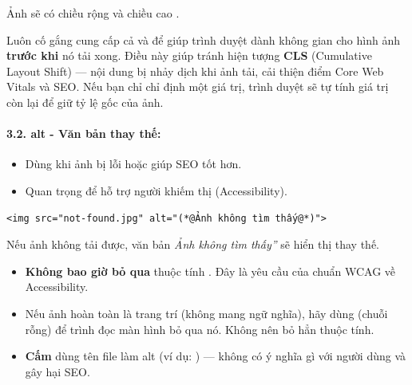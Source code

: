 Ảnh sẽ có chiều rộng \codeinline{200px} và chiều cao \codeinline{150px}.

\begin{tipBox}
Luôn cố gắng cung cấp cả  và  để giúp trình duyệt dành không gian cho hình ảnh \textbf{trước khi} nó tải xong. Điều này giúp tránh hiện tượng \textbf{CLS} (Cumulative Layout Shift) — nội dung bị nhảy dịch khi ảnh tải, cải thiện điểm Core Web Vitals và SEO. Nếu bạn chỉ chỉ định một giá trị, trình duyệt sẽ tự tính giá trị còn lại để giữ tỷ lệ gốc của ảnh.
\end{tipBox}

\paragraph{3.2. alt - Văn bản thay thế:}
\begin{itemize}[leftmargin=1.5em, itemsep=2pt, parsep=0pt]
    \item Dùng khi ảnh bị lỗi hoặc giúp SEO tốt hơn.
    \item Quan trọng để hỗ trợ người khiếm thị (Accessibility).
\end{itemize}

\begin{codeWindow}
\begin{lstlisting}[language=HTML5]
<img src="not-found.jpg" alt="(*@Ảnh không tìm thấy@*)">
\end{lstlisting}
\end{codeWindow}

Nếu ảnh không tải được, văn bản \textit{\codeinline{}Ảnh không tìm thấy''} sẽ hiển thị thay thế.

\begin{warnBox}
\begin{itemize}[leftmargin=1.5em, itemsep=2pt, parsep=0pt]
    \item \textbf{Không bao giờ bỏ qua} thuộc tính . Đây là yêu cầu của chuẩn WCAG về Accessibility.
    \item Nếu ảnh hoàn toàn là trang trí (không mang ngữ nghĩa), hãy dùng  (chuỗi rỗng) để trình đọc màn hình bỏ qua nó. Không nên bỏ hẳn thuộc tính.
    \item \textbf{Cấm} dùng tên file làm alt (ví dụ: ) — không có ý nghĩa gì với người dùng và gây hại SEO.
\end{itemize}
\end{warnBox}

